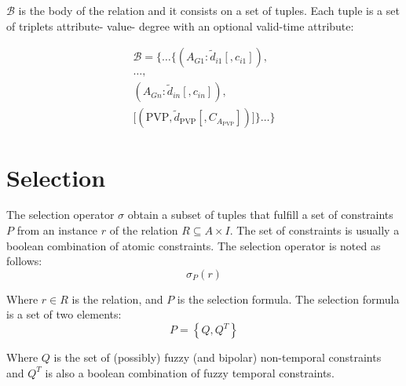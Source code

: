 \documentclass{llncs}
\newcommand{\Body}{\mathcal{B}}
\begin{document}
\begin{definition}
$\Body$ is the body of the relation and it consists on a set of tuples. Each tuple is a set of triplets attribute- value- degree with an optional valid-time attribute:

\begin{align}
\label{eq:body-valid-time}
\Body = \big \lbrace \ldots \{ \left(A_{G1}:\tilde{d}_{i1}\left[,c_{i1} \right] \right),\\
\nonumber
 \ldots,\\
 \nonumber
  \left(A_{Gn}:\tilde{d}_{in}\left[,c_{in} \right] \right),\\
  \nonumber
   \Big[  \left( \text{PVP}, \tilde{d}_{\text{PVP}} \left[,C_{A_{\text{PVP}}} \right] \right)  \Big] \} \ldots \big \rbrace
\end{align}

\end{definition}







\section{\label{sec:selection}Selection}
The selection operator $\sigma$ obtain a subset of tuples that fulfill a set of constraints $P$ from an instance $r$ of the relation $R \subseteq
 A \times I$. The set of constraints is usually a boolean combination of atomic constraints. The selection operator is noted as follows:
\begin{equation}
 \label{eq:selection}
\sigma_{P} \left( r \right)
\end{equation}

Where $r \in R$ is the relation, and $P$ is the selection formula. The selection formula is a set of two elements:
\begin{equation}
 \label{eq:selection_formula}
P = \left \lbrace Q, Q^{T}\right \rbrace
\end{equation}

Where $Q$ is the set of (possibly) fuzzy (and bipolar) non-temporal constraints and $Q^{T}$ is also a boolean combination of fuzzy temporal constraints.
\end{document}
